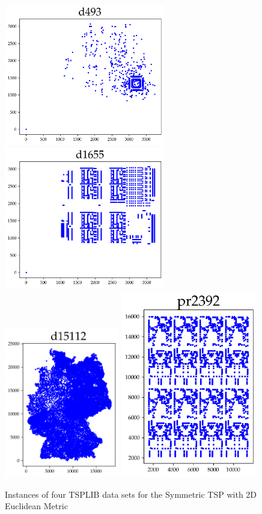 \begin{figure}[htbp]
   \centering
   \includegraphics[width=7cm]{../tsplib_euc2d_pictures_of_instances/d493.png}
   \includegraphics[width=7cm]{../tsplib_euc2d_pictures_of_instances/d1655.png}
   \includegraphics[width=5cm]{../tsplib_euc2d_pictures_of_instances/d15112.png}
   \includegraphics[width=6cm]{../tsplib_euc2d_pictures_of_instances/pr2392.png}
   \caption{\label{fig:tsplibinstances} Instances of four TSPLIB data sets for the Symmetric TSP with 2D Euclidean Metric}
 \end{figure}



